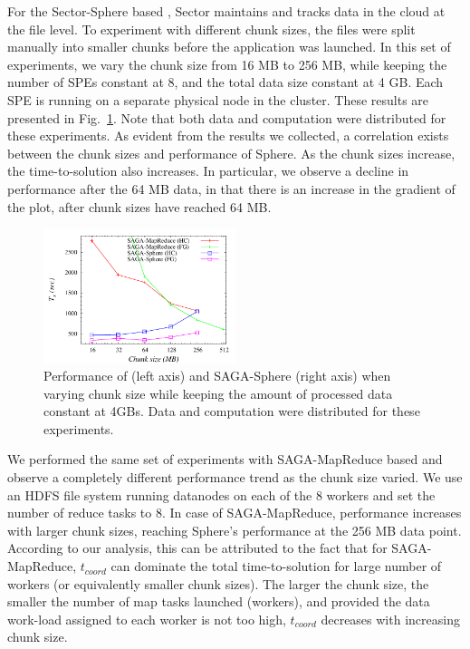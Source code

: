 \documentclass[3p,twocolumn]{elsarticle}
\begin{document}
For the Sector-Sphere based \wc, Sector maintains and tracks data in
the cloud at the file level. To experiment with different chunk sizes, the
files were split manually into smaller chunks before the \wc
application was launched. In this set of experiments, we vary the
chunk size from 16 MB to 256 MB, while keeping the number of SPEs
constant at 8, and the total data size constant at 4 GB. Each SPE is running
on a separate physical node in the cluster. These results are
presented in Fig.~\ref{fig:sphere_mr_chunksize}.  Note that both data
and computation were distributed for these experiments.  As evident
from the results we collected, a correlation exists between the chunk
sizes and performance of Sphere.  As the chunk sizes increase, the
time-to-solution also increases. In particular, we observe a decline in
performance after the 64 MB data, in that there is an increase in the
gradient of the plot, after chunk sizes have reached 64 MB.


\begin{figure}[htb!]
 \dnnn\dnnn
 \includegraphics[width=0.5\textwidth]{figures/sphere_mr_varying_chunksize.pdf}
 \caption{
   Performance of \sagamapreduce (left axis) and
   SAGA-Sphere (right axis) when varying chunk size while keeping the amount
   of processed data constant at 4GBs. Data and computation were
   distributed for these experiments.
   \label{fig:sphere_mr_chunksize}
   }
\end{figure}

We performed the same set of experiments with SAGA-MapReduce based \wc
and observe a completely different performance trend as the chunk size
varied.  We use an HDFS file system running datanodes on each of the 8
workers and set the number of reduce tasks to 8.  In case of
SAGA-MapReduce, performance increases with larger chunk sizes,
reaching Sphere's performance at the 256 MB data point.  According to
our analysis, this can be attributed to the fact that for
SAGA-MapReduce, $t_{coord}$ can dominate the total time-to-solution
for large number of workers (or equivalently smaller chunk sizes).
The larger the chunk size, the smaller the number of map tasks
launched (workers), and provided the data work-load assigned to each
worker is not too high, $t_{coord}$ decreases with increasing chunk
size.
\end{document}
